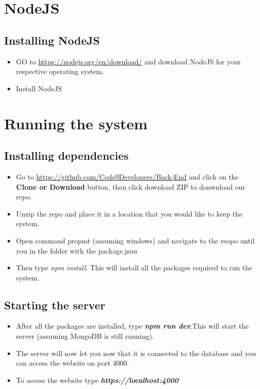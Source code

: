 \documentclass[a4paper,12pt]{article}
\begin{document}
\newpage
\section{NodeJS}
\subsection{Installing NodeJS}
\begin{itemize}
	\item GO to \url{https://nodejs.org/en/download/} and download NodeJS for your respective operating system.
	\item Install NodeJS
\end{itemize}

\section{Running the system}
	\subsection{Installing dependencies}
		\begin{itemize}
			\item Go to \url{https://github.com/Code9Developers/Back-End} and click on the\textbf{ Clone or Download } button, then click download ZIP to donwnload our repo.
			
			\item Unzip the repo and place it in a location that you would like to keep the system.
			
			\item Open command propmt (assuming windows) and navigate to the reopo until you in the folder with the package.json
			
			\item Then type \textit{npm install}. This will install all the packages required to run the system.
		\end{itemize}
		\subsection{Starting the server}
			\begin{itemize}
			\item After all the packages are installed, type \textbf{\textit{npm run dev}}.This will start the server (assuming MongoDB is still running).
			
			\item The server will now let you now that it is connected to the database and you can access the website on port 4000.
			
			\item To access the website type \textbf{\textit{https://localhost:4000}}
		\end{itemize}
\newpage
\end{document}

